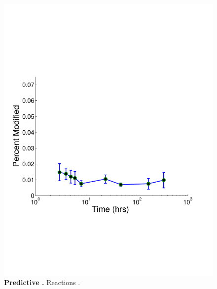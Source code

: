 \documentclass[12pt]{article}
\begin{document}
\clearpage
\begin{figure}[p]
\centerline{\includegraphics[width=5in]{Figures/Nitrosylations.pdf}}
\caption{\label{fig:nitrogen_network}\textbf{Predictive .} Reactions .}
\end{figure}
\end{document}
